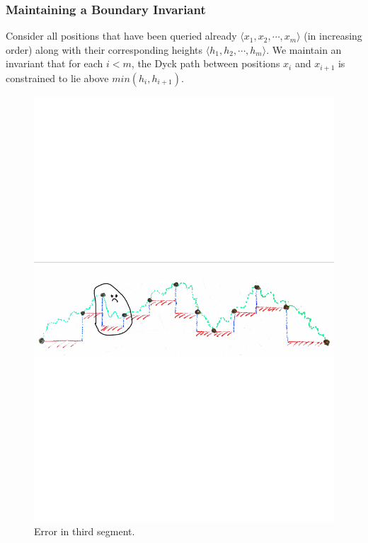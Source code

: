 \subsubsection{Maintaining a Boundary Invariant}%
\label{sec:maintaining_a_boundary_invariant}
Consider all positions that have been queried already $ \langle x_1, x_2,\cdots, x_m \rangle$ (in increasing order)
along with their corresponding heights $ \langle h_1, h_2,\cdots, h_m \rangle$.
We maintain an invariant that for each $i < m$,
the Dyck path between positions $x_i$ and $x_{i+1}$ is constrained to lie above $min(h_i, h_{i+1})$.
\begin{figure}[htpb]
    \centering
    \includegraphics[width=1.0\linewidth, trim={0 12cm 0 12cm}]{images/dyck_boundary_invariant.pdf}
    \caption{Error in third segment.}
    \label{fig:dyck_boundary_invariant}
\end{figure}

